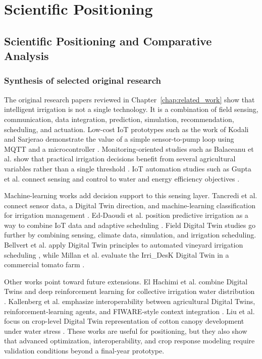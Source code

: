 \part{Scientific Positioning}

\chapter{Scientific Positioning and Comparative Analysis}
\label{chap:scientific_positioning}

\section{Synthesis of selected original research}

The original research papers reviewed in Chapter~\ref{chap:related_work} show that intelligent irrigation is not a single technology. It is a combination of field sensing, communication, data integration, prediction, simulation, recommendation, scheduling, and actuation. Low-cost IoT prototypes such as the work of Kodali and Sarjerao demonstrate the value of a simple sensor-to-pump loop using MQTT and a microcontroller \cite{kodali2017mqttirrigation}. Monitoring-oriented studies such as Balaceanu et al. show that practical irrigation decisions benefit from several agricultural variables rather than a single threshold \cite{balaceanu2019libelium}. IoT automation studies such as Gupta et al. connect sensing and control to water and energy efficiency objectives \cite{gupta2025iotirrigation}.

Machine-learning works add decision support to this sensing layer. Tancredi et al. connect sensor data, a Digital Twin direction, and machine-learning classification for irrigation management \cite{tancredi2025irrigationdt}. Ed-Daoudi et al. position predictive irrigation as a way to combine IoT data and adaptive scheduling \cite{eddaoudi2024predictiveirrigation}. Field Digital Twin studies go further by combining sensing, climate data, simulation, and irrigation scheduling. Bellvert et al. apply Digital Twin principles to automated vineyard irrigation scheduling \cite{bellvert2023vineyarddt}, while Millan et al. evaluate the Irri\_DesK Digital Twin in a commercial tomato farm \cite{millan2025tomatodt}.

Other works point toward future extensions. El Hachimi et al. combine Digital Twins and deep reinforcement learning for collective irrigation water distribution \cite{elhachimi2025collectiveirrigationdt}. Kallenberg et al. emphasize interoperability between agricultural Digital Twins, reinforcement-learning agents, and FIWARE-style context integration \cite{kallenberg2025interoperabledt}. Liu et al. focus on crop-level Digital Twin representation of cotton canopy development under water stress \cite{liu2025cottondt}. These works are useful for positioning, but they also show that advanced optimization, interoperability, and crop response modeling require validation conditions beyond a final-year prototype.

